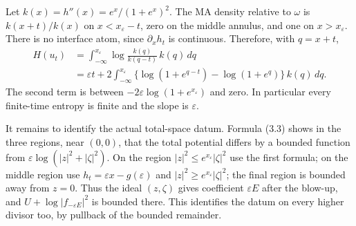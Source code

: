 \documentclass[
  11pt,
]{article}
\begin{document}
Let \(k(x)=h''(x)=e^x/(1+e^x)^2\). The MA density relative to \(\omega\)
is \(k(x+t)/k(x)\) on \(x<x_\varepsilon-t\), zero on the middle annulus,
and one on \(x>x_\varepsilon\). There is no interface atom, since
\(\partial_xh_t\) is continuous. Therefore, with \(q=x+t\), \[
 \begin{split}
 H(u_t)&=\int_{-\infty}^{x_\varepsilon}
      \log\frac{k(q)}{k(q-t)}\,k(q)\,dq\\
 &=\varepsilon t+2\int_{-\infty}^{x_\varepsilon}
       \{\log(1+e^{q-t})-\log(1+e^q)\}\,k(q)\,dq.
 \end{split}                                                \tag{3.4}
\] The second term is between \(-2\varepsilon\log(1+e^{x_\varepsilon})\)
and zero. In particular every finite-time entropy is finite and the
slope is \(\varepsilon\).

It remains to identify the actual total-space datum. Formula (3.3) shows
in the three regions, near \((0,0)\), that the total potential differs
by a bounded function from \(\varepsilon\log(|z|^2+|\zeta|^2)\). On the
region \(|z|^2\leq e^{x_\varepsilon}|\zeta|^2\) use the first formula;
on the middle region use \(h_t=\varepsilon x-g(\varepsilon)\) and
\(|z|^2\geq e^{x_\varepsilon}|\zeta|^2\); the final region is bounded
away from \(z=0\). Thus the ideal \((z,\zeta)\) gives coefficient
\(\varepsilon E\) after the blow-up, and
\(U+\log|f_{-\varepsilon E}|^2\) is bounded there. This identifies the
datum on every higher divisor too, by pullback of the bounded remainder.
\end{document}
